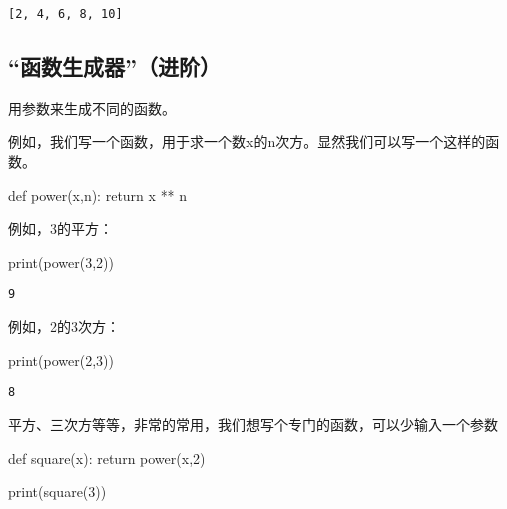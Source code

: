 \documentclass[
  letterpaper,
  DIV=11,
  numbers=noendperiod]{scrreprt}
\newenvironment{Shaded}{\begin{snugshade}}{\end{snugshade}}
\newcommand{\BuiltInTok}[1]{\textcolor[rgb]{0.00,0.23,0.31}{#1}}
\newcommand{\ControlFlowTok}[1]{\textcolor[rgb]{0.00,0.23,0.31}{#1}}
\newcommand{\DecValTok}[1]{\textcolor[rgb]{0.68,0.00,0.00}{#1}}
\newcommand{\KeywordTok}[1]{\textcolor[rgb]{0.00,0.23,0.31}{#1}}
\newcommand{\NormalTok}[1]{\textcolor[rgb]{0.00,0.23,0.31}{#1}}
\newcommand{\OperatorTok}[1]{\textcolor[rgb]{0.37,0.37,0.37}{#1}}
\begin{document}
\begin{verbatim}
[2, 4, 6, 8, 10]
\end{verbatim}

\hypertarget{ux51fdux6570ux751fux6210ux5668ux8fdbux9636}{%
\subsection{``函数生成器''（进阶）}\label{ux51fdux6570ux751fux6210ux5668ux8fdbux9636}}

用参数来生成不同的函数。

例如，我们写一个函数，用于求一个数x的n次方。显然我们可以写一个这样的函数。

\begin{Shaded}
\begin{Highlighting}[]
\KeywordTok{def}\NormalTok{ power(x,n):}
    \ControlFlowTok{return}\NormalTok{ x }\OperatorTok{**}\NormalTok{ n}
\end{Highlighting}
\end{Shaded}

例如，3的平方：

\begin{Shaded}
\begin{Highlighting}[]
\BuiltInTok{print}\NormalTok{(power(}\DecValTok{3}\NormalTok{,}\DecValTok{2}\NormalTok{))}
\end{Highlighting}
\end{Shaded}

\begin{verbatim}
9
\end{verbatim}

例如，2的3次方：

\begin{Shaded}
\begin{Highlighting}[]
\BuiltInTok{print}\NormalTok{(power(}\DecValTok{2}\NormalTok{,}\DecValTok{3}\NormalTok{))}
\end{Highlighting}
\end{Shaded}

\begin{verbatim}
8
\end{verbatim}

平方、三次方等等，非常的常用，我们想写个专门的函数，可以少输入一个参数

\begin{Shaded}
\begin{Highlighting}[]
\KeywordTok{def}\NormalTok{ square(x):}
    \ControlFlowTok{return}\NormalTok{ power(x,}\DecValTok{2}\NormalTok{)}

\BuiltInTok{print}\NormalTok{(square(}\DecValTok{3}\NormalTok{))}
\end{Highlighting}
\end{Shaded}
\end{document}
